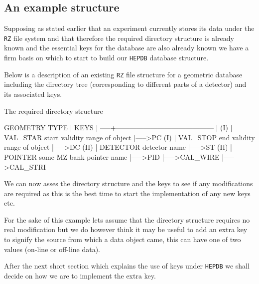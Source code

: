 \subsection{An example structure}
Supposing as stated earlier that an experiment currently stores its data under
the {\tt RZ} file system and that therefore the required directory structure is
already known and the essential keys for the database are also already known
we have a firm basis on which to start to build our {\tt HEPDB} database structure.
\par
Below is a description of an existing {\tt RZ} file structure for a geometric database
including the directory tree (corresponding to different parts of a detector) and its
associated keys.
%
%
\begin{XMPt}{The required directory structure}

GEOMETRY                  TYPE |  KEYS
  |                       -----+------------------------------------------
  |                       (I)  |  VAL_STAR  start validity range of object
  |----->PC               (I)  |  VAL_STOP  end   validity range of object
  |----->DC               (H)  |  DETECTOR  detector name
  |----->ST               (H)  |  POINTER   some MZ bank pointer name
  |----->PID
  |----->CAL_WIRE
  |----->CAL_STRI

\end{XMPt}
We can now asses the directory structure and the keys to see if any modifications
are required as this is the best time to start the implementation of any new keys etc.
\par
For the sake of this example lets assume that the directory structure requires no real
modification but we do however think it may be useful to add an extra key to signify
the source from which a data object came, this can have one of two values (on-line or
off-line data).
\par
After the next short section which explains the use of keys under {\tt HEPDB} we shall
decide on how we are to implement the extra key.
%
%
%
